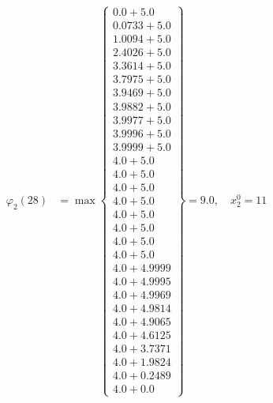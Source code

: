 \documentclass{article}
\begin{document}
\begin{align*}
\varphi_{2}(28) &= \max \left\{ \begin{array}{c}
0.0 + 5.0 \\
 0.0733 + 5.0 \\
 1.0094 + 5.0 \\
 2.4026 + 5.0 \\
 3.3614 + 5.0 \\
 3.7975 + 5.0 \\
 3.9469 + 5.0 \\
 3.9882 + 5.0 \\
 3.9977 + 5.0 \\
 3.9996 + 5.0 \\
 3.9999 + 5.0 \\
 4.0 + 5.0 \\
 4.0 + 5.0 \\
 4.0 + 5.0 \\
 4.0 + 5.0 \\
 4.0 + 5.0 \\
 4.0 + 5.0 \\
 4.0 + 5.0 \\
 4.0 + 5.0 \\
 4.0 + 4.9999 \\
 4.0 + 4.9995 \\
 4.0 + 4.9969 \\
 4.0 + 4.9814 \\
 4.0 + 4.9065 \\
 4.0 + 4.6125 \\
 4.0 + 3.7371 \\
 4.0 + 1.9824 \\
 4.0 + 0.2489 \\
 4.0 + 0.0
\end{array} \right\}=9.0, \quad x_{2}^0=11\\
  

\end{align*}
\end{document}
